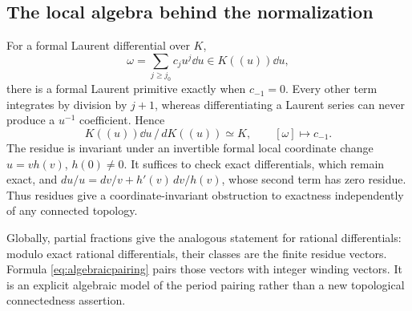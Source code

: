 \documentclass[11pt,letterpaper]{article}
\theoremstyle{definition}
\theoremstyle{remark}
\numberwithin{equation}{section}
\begin{document}
\subsection{The local algebra behind the normalization}
For a formal Laurent differential over $K$,
\[
 \omega=\sum_{j\ge j_0}c_j u^j\dd u\in K((u))\dd u,
\]
there is a formal Laurent primitive exactly when $c_{-1}=0$. Every other term integrates by division by $j+1$, whereas differentiating a Laurent series can never produce a $u^{-1}$ coefficient. Hence
\begin{equation}\label{eq:formalresclass}
 K((u))\dd u\,/\,dK((u))\simeq K,\qquad[\omega]\longmapsto c_{-1}.
\end{equation}
The residue is invariant under an invertible formal local coordinate change $u=v h(v)$, $h(0)\ne0$. It suffices to check exact differentials, which remain exact, and $du/u=dv/v+h'(v)\,dv/h(v)$, whose second term has zero residue. Thus residues give a coordinate-invariant obstruction to exactness independently of any connected topology.

Globally, partial fractions give the analogous statement for rational differentials: modulo exact rational differentials, their classes are the finite residue vectors. Formula \eqref{eq:algebraicpairing} pairs those vectors with integer winding vectors. It is an explicit algebraic model of the period pairing rather than a new topological connectedness assertion.
\end{document}
